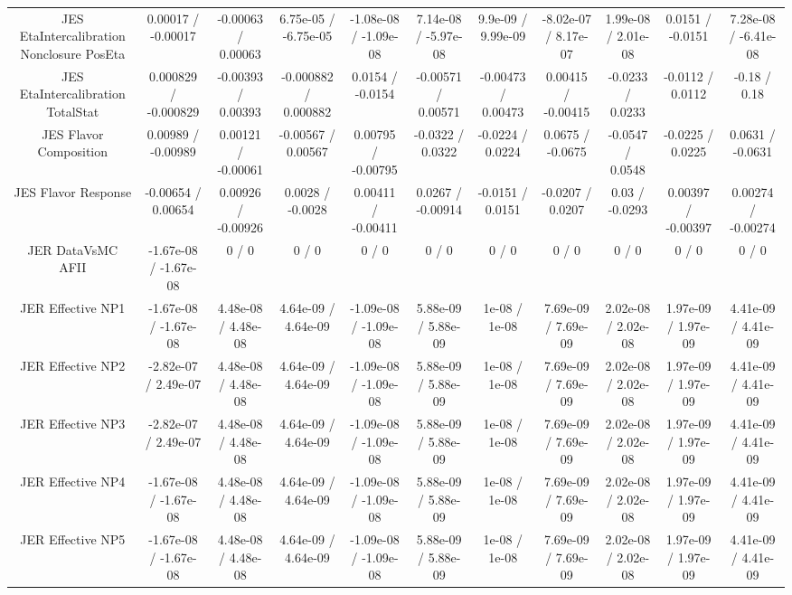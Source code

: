 \begin{table}[htbp]
\begin{center}
\begin{tabular}{|c|c|c|c|c|c|c|c|c|c|c|}
  JES EtaIntercalibration Nonclosure PosEta & 0.00017 / -0.00017 & -0.00063 / 0.00063 & 6.75e-05 / -6.75e-05 & -1.08e-08 / -1.09e-08 & 7.14e-08 / -5.97e-08 & 9.9e-09 / 9.99e-09 & -8.02e-07 / 8.17e-07 & 1.99e-08 / 2.01e-08 & 0.0151 / -0.0151 & 7.28e-08 / -6.41e-08 \\ 
  JES EtaIntercalibration TotalStat & 0.000829 / -0.000829 & -0.00393 / 0.00393 & -0.000882 / 0.000882 & 0.0154 / -0.0154 & -0.00571 / 0.00571 & -0.00473 / 0.00473 & 0.00415 / -0.00415 & -0.0233 / 0.0233 & -0.0112 / 0.0112 & -0.18 / 0.18 \\ 
  JES Flavor Composition & 0.00989 / -0.00989 & 0.00121 / -0.00061 & -0.00567 / 0.00567 & 0.00795 / -0.00795 & -0.0322 / 0.0322 & -0.0224 / 0.0224 & 0.0675 / -0.0675 & -0.0547 / 0.0548 & -0.0225 / 0.0225 & 0.0631 / -0.0631 \\ 
  JES Flavor Response & -0.00654 / 0.00654 & 0.00926 / -0.00926 & 0.0028 / -0.0028 & 0.00411 / -0.00411 & 0.0267 / -0.00914 & -0.0151 / 0.0151 & -0.0207 / 0.0207 & 0.03 / -0.0293 & 0.00397 / -0.00397 & 0.00274 / -0.00274 \\ 
  JER DataVsMC AFII & -1.67e-08 / -1.67e-08 & 0 / 0 & 0 / 0 & 0 / 0 & 0 / 0 & 0 / 0 & 0 / 0 & 0 / 0 & 0 / 0 & 0 / 0 \\ 
  JER Effective NP1 & -1.67e-08 / -1.67e-08 & 4.48e-08 / 4.48e-08 & 4.64e-09 / 4.64e-09 & -1.09e-08 / -1.09e-08 & 5.88e-09 / 5.88e-09 & 1e-08 / 1e-08 & 7.69e-09 / 7.69e-09 & 2.02e-08 / 2.02e-08 & 1.97e-09 / 1.97e-09 & 4.41e-09 / 4.41e-09 \\ 
  JER Effective NP2 & -2.82e-07 / 2.49e-07 & 4.48e-08 / 4.48e-08 & 4.64e-09 / 4.64e-09 & -1.09e-08 / -1.09e-08 & 5.88e-09 / 5.88e-09 & 1e-08 / 1e-08 & 7.69e-09 / 7.69e-09 & 2.02e-08 / 2.02e-08 & 1.97e-09 / 1.97e-09 & 4.41e-09 / 4.41e-09 \\ 
  JER Effective NP3 & -2.82e-07 / 2.49e-07 & 4.48e-08 / 4.48e-08 & 4.64e-09 / 4.64e-09 & -1.09e-08 / -1.09e-08 & 5.88e-09 / 5.88e-09 & 1e-08 / 1e-08 & 7.69e-09 / 7.69e-09 & 2.02e-08 / 2.02e-08 & 1.97e-09 / 1.97e-09 & 4.41e-09 / 4.41e-09 \\ 
  JER Effective NP4 & -1.67e-08 / -1.67e-08 & 4.48e-08 / 4.48e-08 & 4.64e-09 / 4.64e-09 & -1.09e-08 / -1.09e-08 & 5.88e-09 / 5.88e-09 & 1e-08 / 1e-08 & 7.69e-09 / 7.69e-09 & 2.02e-08 / 2.02e-08 & 1.97e-09 / 1.97e-09 & 4.41e-09 / 4.41e-09 \\ 
  JER Effective NP5 & -1.67e-08 / -1.67e-08 & 4.48e-08 / 4.48e-08 & 4.64e-09 / 4.64e-09 & -1.09e-08 / -1.09e-08 & 5.88e-09 / 5.88e-09 & 1e-08 / 1e-08 & 7.69e-09 / 7.69e-09 & 2.02e-08 / 2.02e-08 & 1.97e-09 / 1.97e-09 & 4.41e-09 / 4.41e-09 \\ 

\end{tabular}
\end{center}
\end{table}
